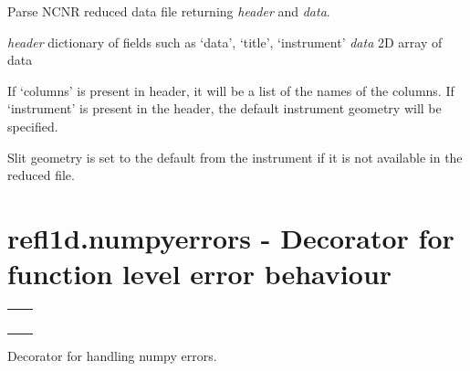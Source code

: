 \documentclass[letterpaper,10pt,english]{sphinxmanual}
\begin{document}

\begin{fulllineitems}
\label{api/ncnrdata:refl1d.ncnrdata.parse_file}
Parse NCNR reduced data file returning \emph{header} and \emph{data}.

\emph{header} dictionary of fields such as `data', `title', `instrument'
\emph{data} 2D array of data

If `columns' is present in header, it will be a list of the names of
the columns.  If `instrument' is present in the header, the default
instrument geometry will be specified.

Slit geometry is set to the default from the instrument if it is not
available in the reduced file.

\end{fulllineitems}



\section{refl1d.numpyerrors - Decorator for function level error behaviour}
\label{api/numpyerrors:refl1d-numpyerrors-decorator-for-function-level-error-behaviour}\label{api/numpyerrors::doc}
\begin{tabulary}{\linewidth}{LL}
\hline

{\hyperref[api/numpyerrors:refl1d.numpyerrors.errors]{}}
 & 

\\

{\hyperref[api/numpyerrors:refl1d.numpyerrors.ignored]{}}
 & 

\\

{\hyperref[api/numpyerrors:refl1d.numpyerrors.printed]{}}
 & 

\\

{\hyperref[api/numpyerrors:refl1d.numpyerrors.raised]{}}
 & 

\\

{\hyperref[api/numpyerrors:refl1d.numpyerrors.warned]{}}
 & 

\\
\hline
\end{tabulary}

\label{api/numpyerrors:module-refl1d.numpyerrors}
Decorator for handling numpy errors.
\end{document}
